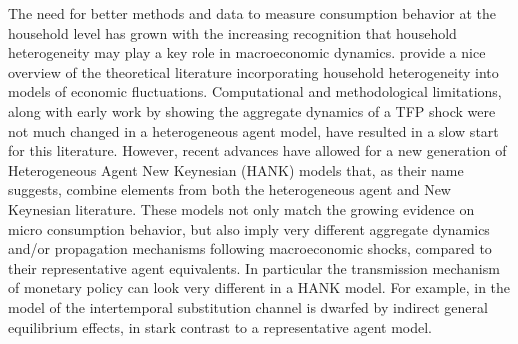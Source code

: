 \documentclass[titlepage]{\econtex}\newcommand{\texname}{ConsumptionHeterogeneity}
\begin{document}
The need for better methods and data to measure consumption behavior at the household level has grown with the increasing recognition that household heterogeneity may play a key role in macroeconomic dynamics. \cite{kaplan_microeconomic_2018} provide a nice overview of the theoretical literature incorporating household heterogeneity into models of economic fluctuations. Computational and methodological limitations, along with early work by \cite{krusell_income_1998} showing the aggregate dynamics of a TFP shock were not much changed in a heterogeneous agent model, have resulted in a slow start for this literature. However, recent advances have allowed for a new generation of Heterogeneous Agent New Keynesian (HANK) models that, as their name suggests, combine elements from both the heterogeneous agent and New Keynesian literature. These models not only match the growing evidence on micro consumption behavior, but also imply very different aggregate dynamics and/or propagation mechanisms following macroeconomic shocks, compared to their representative agent equivalents. In particular the transmission mechanism of monetary policy can look very different in a HANK model. For example, in the model of \cite{kaplan_monetary_2016} the intertemporal substitution channel is dwarfed by indirect general equilibrium effects, in stark contrast to a representative agent model.
\end{document}
